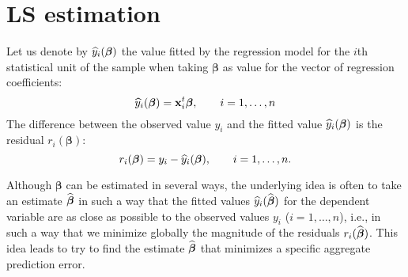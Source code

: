 \section{LS estimation}

Let us denote by $\widehat{y}_{i}(\boldsymbol\beta)$ the value fitted by the
regression model for the $i$th statistical unit of the sample when taking
$\boldsymbol\beta$ as value for the vector of regression coefficients:
\[
    \widehat{y}_{i}(\boldsymbol\beta)  = \mathbf x_{i}^t\boldsymbol\beta, 
    \qquad i = 1, \dots, n
\]
The difference between the observed value $y_{i}$ and the fitted value
$\widehat{y}_{i}(\boldsymbol\beta)$ is the residual $r_{i}(\boldsymbol\beta)$:
\[
    r_{i}(\boldsymbol\beta) = y_{i} - \widehat{y}_{i}(\boldsymbol\beta),
    \qquad i = 1, \dots, n.
\]

Although $\boldsymbol\beta$ can be estimated in several ways, the underlying
idea is often to take an estimate $\widehat{\boldsymbol\beta}$ in such a way that
the fitted values $\widehat{y}_{i}(\widehat{\boldsymbol\beta})$ for the dependent
variable are as close as possible to the observed values $y_{i}$ ($i = 1,
\dots, n$), i.e., in such a way that we minimize globally the magnitude of the
residuals $r_{i}(\widehat{\boldsymbol\beta})$. This idea leads to try to find the
estimate $\widehat{\boldsymbol\beta}$ that minimizes a specific aggregate
prediction error.


